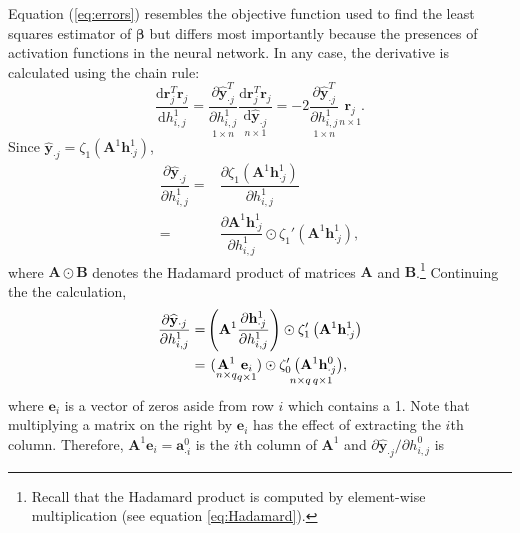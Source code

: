 \documentclass[graybox,envcountchap]{svmono}
\newcommand{\hf}{\mathbf{h}}
\newcommand{\yf}{\mathbf{y}}
\newcommand{\bef}{\boldsymbol{\beta}}
\newcommand{\nn}{neural network}
\newcommand{\w}{\widehat}
\begin{document}
Equation (\ref{eq:errors}) resembles the objective function used to find the least squares estimator of $\bef$ but differs most importantly because the presences of activation functions in the \nn .
In any case, the derivative is calculated using the chain rule:
\begin{equation}\label{eq:firstExample}
\dfrac{\text{d}\mathbf{r}_j^T\mathbf{r}_j}{\text{d} h^1_{i,j}}  = \underset{1 \times n}{\dfrac{\partial \w{\yf}_{\cdot j}^T}{\partial h^1_{i,j}}} 
 \underset{n \times 1}{ \dfrac{\text{d} \mathbf{r}_j^T\mathbf{r}_j }{ \text{d}\w{\yf}_{\cdot j}} }
 =-2\underset{1 \times n}{\dfrac{\partial \w{\yf}^T_{\cdot j}}{\partial h^1_{i,j}}} \underset{n \times 1}{\mathbf{r}_j}.
\end{equation}
Since $\w{\yf}_{\cdot j} = \zeta_1(\mathbf{A}^1 \hf^1_{\cdot j})$,
\begin{equation}\label{eq:grad0}
 \begin{align}{\dfrac{\partial \w{\yf}_{\cdot j}}{\partial h^1_{i,j}}}=&  \dfrac{\partial  \zeta_1\left( {\mathbf{A}^1}{\hf_{\cdot j}^1} \right)}{\partial h^1_{i,j}}\\
 =&\dfrac{\partial  {\mathbf{A}^1}{\hf_{\cdot j}^1} }{\partial h^1_{i,j}} \odot  \zeta_1'\left( {\mathbf{A}^1}{\hf_{\cdot j}^1}\right),
 \end{align}
\end{equation}
where $\mathbf{A} \odot \mathbf{B}$ denotes the Hadamard product of matrices $\mathbf{A}$ and $\mathbf{B}$.\footnote{Recall that the Hadamard product is computed by element-wise multiplication (see equation \ref{eq:Hadamard}).} Continuing the the calculation,
\begin{equation}\label{eq:grad0cont}
 \begin{align}
 {\dfrac{\partial \w{\yf}_{\cdot j}}{\partial h^1_{i,j}}}=&\left( {\mathbf{A}^1}\dfrac{\partial  {\hf_{\cdot j}^1} }{\partial h^1_{i,j}}  \right)\odot  \zeta_1'\left( {\mathbf{A}^1}{\hf_{\cdot j}^1} \right)\\
 =&\hspace{.05 in }( \underset{n \times q}{\mathbf{A}^1}\underset{q \times 1}{ \mathbf{e}_i }) \odot \underset{n \times q \hspace{.02 in}q \times 1}{ \zeta_0'\left( {\mathbf{A}^1}{\hf_{\cdot j}^0} \right)},
 \end{align}
\end{equation}
where $\mathbf{e}_i$ is a vector of zeros aside from row $i$ which contains a 1. Note that multiplying a matrix on the right by $\mathbf{e}_i$ has the effect of extracting the $i$th column. Therefore, $\mathbf{A}^1\mathbf{e}_i = \mathbf{a}^0_{\cdot i }$ is the $i$th column of $\mathbf{A}^1$ and ${\partial \w{\yf}_{\cdot j}/\partial h^0_{i,j}}$ is 
\end{document}
